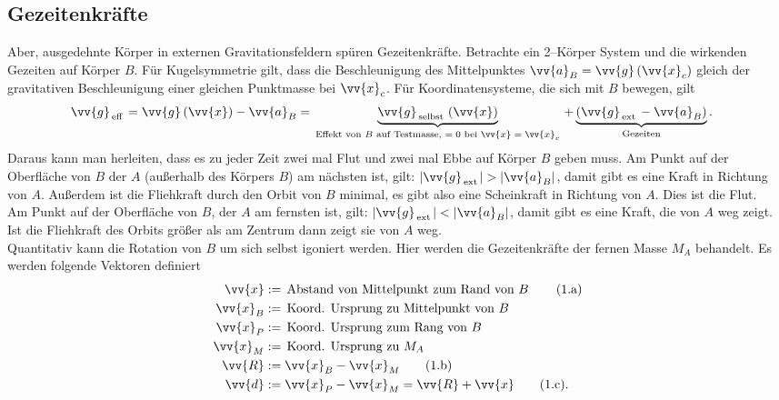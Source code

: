 \documentclass[a4paper,12pt]{article}
\newcommand\inlineeqnowoa{\theequation.\text{a}}
\newcommand\inlineeqnowob{\theequation.\text{b}}
\newcommand\inlineeqnowoc{\theequation.\text{c}}
\numberwithin{equation}{section}
\begin{document}
\subsection{Gezeitenkräfte}
Aber, ausgedehnte Körper in externen Gravitationsfeldern spüren Gezeitenkräfte. Betrachte ein 2--Körper System und die wirkenden Gezeiten auf Körper $B$. Für Kugelsymmetrie gilt, dass die Beschleunigung des Mittelpunktes $\vv{a}_B=\vv{g}\left(\vv{x}_c\right)$ gleich der gravitativen Beschleunigung einer gleichen Punktmasse bei $\vv{x}_c$. Für Koordinatensysteme, die sich mit $B$ bewegen, gilt
\begin{align} 
        \vv{g}_{\,\text{eff}\,}&=\vv{g}\left(\vv{x}\right)-\vv{a}_B=\underbrace{\vv{g}_{\,\text{selbst}\,}\left(\vv{x}\right)}_{\,\text{Effekt von $B$ auf Testmasse, $=0$ bei $\vv{x}=\vv{x}_c$}\,}+\underbrace{\left(\vv{g}_{\,\text{ext}\,}-\vv{a}_B\right)}_{\,\text{Gezeiten}\,}\label{eq:8.13}
.\end{align} 
Daraus kann man herleiten, dass es zu jeder Zeit zwei mal \glqq Flut\grqq{} und zwei mal \glqq Ebbe\grqq{} auf Körper $B$ geben muss. Am Punkt auf der Oberfläche von $B$ der $A$ (außerhalb des Körpers $B$) am nächsten ist, gilt: $|\vv{g}_{\,\text{ext}\,}|>|\vv{a}_B|$, damit gibt es eine Kraft in Richtung von $A$. Außerdem ist die Fliehkraft durch den Orbit von $B$ minimal, es gibt also eine Scheinkraft in Richtung von $A$. Dies ist die \glqq Flut\grqq{}.\\\indent
Am Punkt auf der Oberfläche von $B$, der $A$ am fernsten ist, gilt: $|\vv{g}_{\,\text{ext}\,}|<|\vv{a}_B|$, damit gibt es eine Kraft, die von $A$ weg zeigt. Ist die Fliehkraft des Orbits größer als am Zentrum dann zeigt sie von $A$ weg.\\\indent
Quantitativ kann die Rotation von $B$ um sich selbst igoniert werden. Hier werden die Gezeitenkräfte der fernen Masse $M_A$ behandelt. Es werden folgende Vektoren definiert
\begin{align}
        \vv{x}&:=\,\text{Abstand von Mittelpunkt zum Rand von $B$}\,\stepcounter{equation}\tag{\inlineeqnowoa}\label{eq:8.14.a}\\
        \vv{x}_B&:=\,\text{Koord. Ursprung zu Mittelpunkt von $B$}\,\nonumber \\
        \vv{x}_P&:=\,\text{Koord. Ursprung zum Rang von $B$}\,\nonumber \\
        \vv{x}_M&:=\,\text{Koord. Ursprung zu $M_A$}\,\nonumber \\
        \vv{R}&:=\vv{x}_B-\vv{x}_M\tag{\inlineeqnowob}\label{eq:8.14.b}\\
        \vv{d}&:=\vv{x}_P-\vv{x}_M=\vv{R}+\vv{x}\tag{\inlineeqnowoc}\label{eq:8.14.c}
.\end{align}
\end{document}
